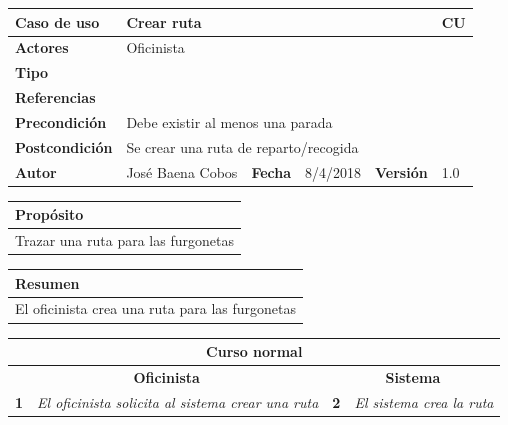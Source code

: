\documentclass[12pt,spanish]{article}
\begin{document}
\begin{table}[H]
	\centering
	\begin{tabular}{|m{3cm}|m{4cm}|m{2cm}|m{2cm}|m{2cm}|m{1cm}|}
		\hline
		\textbf{Caso de uso} &  \multicolumn{4}{m{11cm}|}{Crear ruta} \vline &  \cellcolor{gray!40}CU\arabic{contadorCU}  \stepcounter{contadorCU} \\
		\hline
		\textbf{Actores} & \multicolumn{5}{m{11cm}|}{Oficinista} \\
		\hline
		\textbf{Tipo} & \multicolumn{5}{m{11cm}|}{} \\
		\hline
		\textbf{Referencias} &\multicolumn{5}{m{11cm}|}{} \\
		\hline
		\textbf{Precondición} & \multicolumn{5}{m{11cm}|}{Debe existir al menos una parada} \\
		\hline
		\textbf{Postcondición} & \multicolumn{5}{m{11cm}|}{Se crear una ruta de reparto/recogida} \\
		\hline
		\textbf{Autor} & José Baena Cobos & \textbf{Fecha} & 8/4/2018 & \textbf{Versión} & 1.0 \\
		\hline
	\end{tabular}
	
	\vspace{1cm}
	
	\begin{tabular}{|m{16.2cm}|}
		\hline
		\textbf{Propósito} \\
		\hline
		Trazar una ruta para las furgonetas\\
		\hline
	\end{tabular}
	
	\vspace{1cm}
	
	\begin{tabular}{|m{16.2cm}|}
		\hline
		\textbf{Resumen} \\
		\hline
		El oficinista crea una ruta para las furgonetas\\
		\hline
	\end{tabular}
	
	\vspace{1cm}
	
	\begin{tabular}{|m{5pt}|m{7.33cm}|m{5pt}|m{7.33cm}|}
		\hline
		\multicolumn{4}{|c|}{\textbf{Curso normal}} \\
		\hline
		\multicolumn{2}{|c}{\textbf{Oficinista}} & \multicolumn{2}{|c|}{\textbf{Sistema}} \\
		\hline
		\textbf{1} & \textit{El oficinista solicita al sistema crear una ruta} & \textbf{2} & \textit{El sistema crea la ruta} \\
		\hline
	

\end{tabular}
\end{table}
\end{document}
